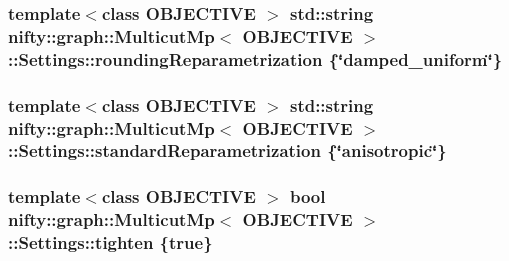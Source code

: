 \subsubsection[{rounding\+Reparametrization}]{\setlength{\rightskip}{0pt plus 5cm}template$<$class O\+B\+J\+E\+C\+T\+I\+V\+E $>$ std\+::string {\bf nifty\+::graph\+::\+Multicut\+Mp}$<$ O\+B\+J\+E\+C\+T\+I\+V\+E $>$\+::Settings\+::rounding\+Reparametrization \{\char`\"{}damped\+\_\+uniform\char`\"{}\}}\label{structnifty_1_1graph_1_1MulticutMp_1_1Settings_a135a6729ca9b40484215cc0fc564f517}
\hypertarget{structnifty_1_1graph_1_1MulticutMp_1_1Settings_a9a9045813f240e40456d4bd168ca53db}{}
\subsubsection[{standard\+Reparametrization}]{\setlength{\rightskip}{0pt plus 5cm}template$<$class O\+B\+J\+E\+C\+T\+I\+V\+E $>$ std\+::string {\bf nifty\+::graph\+::\+Multicut\+Mp}$<$ O\+B\+J\+E\+C\+T\+I\+V\+E $>$\+::Settings\+::standard\+Reparametrization \{\char`\"{}anisotropic\char`\"{}\}}\label{structnifty_1_1graph_1_1MulticutMp_1_1Settings_a9a9045813f240e40456d4bd168ca53db}
\hypertarget{structnifty_1_1graph_1_1MulticutMp_1_1Settings_a55358123a599dcfdfece677a526add9b}{}
\subsubsection[{tighten}]{\setlength{\rightskip}{0pt plus 5cm}template$<$class O\+B\+J\+E\+C\+T\+I\+V\+E $>$ bool {\bf nifty\+::graph\+::\+Multicut\+Mp}$<$ O\+B\+J\+E\+C\+T\+I\+V\+E $>$\+::Settings\+::tighten \{true\}}\label{structnifty_1_1graph_1_1MulticutMp_1_1Settings_a55358123a599dcfdfece677a526add9b}
\hypertarget{structnifty_1_1graph_1_1MulticutMp_1_1Settings_a42b0f297defd402eacc8d1831dd1a804}{}
